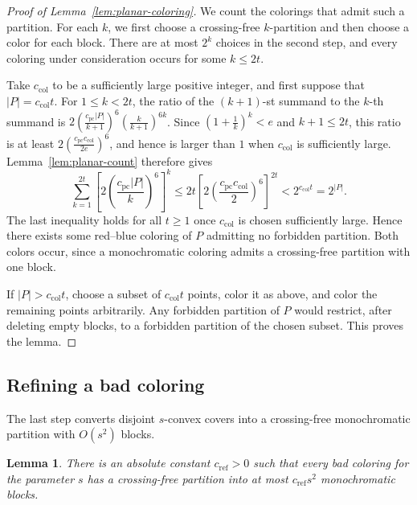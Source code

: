 \documentclass[11pt]{article}
\newtheorem{lemma}[theorem]{Lemma}
\theoremstyle{definition}
\newcommand*{\abs}[1]{\lvert#1\rvert}
\begin{document}
\begin{proof}[Proof of Lemma~\ref{lem:planar-coloring}]
We count the colorings that admit such a partition. For each \(k\), we first choose a crossing-free \(k\)-partition and then choose a color for each block. There are at most \(2^{k}\) choices in the second step, and every coloring under consideration occurs for some \(k\le2t\).

Take \(c_{\mathrm{col}}\) to be a sufficiently large positive integer, and first suppose that \(\abs{P}=c_{\mathrm{col}}t\). For \(1\le k<2t\), the ratio of the \((k+1)\)-st summand to the \(k\)-th summand is
\(2(\frac{c_{\mathrm{pc}}\abs{P}}{k+1})^{6}
(\frac{k}{k+1})^{6k}\).
Since \((1+\frac{1}{k})^{k}<e\) and \(k+1\le2t\), this ratio is at least
\(2(\frac{c_{\mathrm{pc}}c_{\mathrm{col}}}{2e})^{6}\), and hence is larger than \(1\) when \(c_{\mathrm{col}}\) is sufficiently large. Lemma~\ref{lem:planar-count} therefore gives
\[
\sum_{k=1}^{2t}\left[2\left(\frac{c_{\mathrm{pc}}\abs{P}}{k}\right)^{6}\right]^{k}
\le
2t\left[2\left(\frac{c_{\mathrm{pc}}c_{\mathrm{col}}}{2}\right)^{6}\right]^{2t}
<
2^{c_{\mathrm{col}}t}
=
2^{\abs{P}}.
\]
The last inequality holds for all \(t\ge1\) once
\(c_{\mathrm{col}}\) is chosen sufficiently large. Hence there exists some red--blue coloring of \(P\) admitting no forbidden partition. Both colors occur, since a monochromatic coloring admits a crossing-free partition with one block.

If \(\abs{P}>c_{\mathrm{col}}t\), choose a subset of \(c_{\mathrm{col}}t\) points, color it as above, and color the remaining points arbitrarily. Any forbidden partition of \(P\) would restrict, after deleting empty blocks, to a forbidden partition of the chosen subset. This proves the lemma.
\end{proof}


\subsection{Refining a bad coloring}

The last step converts disjoint \(s\)-convex covers into a crossing-free monochromatic partition with \(O(s^{2})\) blocks.

\begin{lemma}\label{lem:planar-refinement}
There is an absolute constant \(c_{\mathrm{ref}}>0\) such that every bad coloring for the parameter \(s\) has a crossing-free partition into at most \(c_{\mathrm{ref}}s^{2}\) monochromatic blocks.
\end{lemma}
\end{document}

